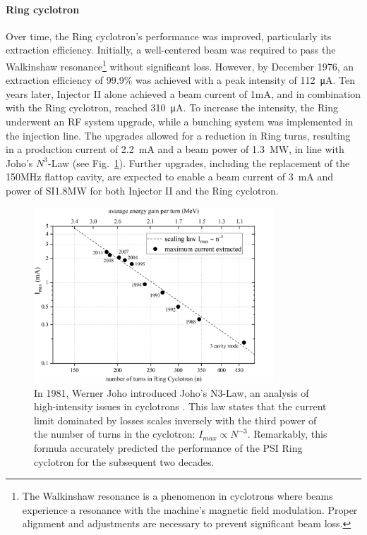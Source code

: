 \begin{refsection}
        \paragraph{Ring cyclotron}
        Over time, the Ring cyclotron's performance was improved, particularly its extraction efficiency. 
        Initially, a well-centered beam was required to pass the Walkinshaw resonance\footnote{The Walkinshaw resonance is a phenomenon in cyclotrons where beams experience a resonance with the machine's magnetic field modulation. Proper alignment and adjustments are necessary to prevent significant beam loss.} without significant loss.
        However, by December 1976, an extraction efficiency of 99.9\% was achieved with a peak intensity of \SI{112}{\micro A}. 
        Ten years later, Injector II alone achieved a beam current of 1mA, and in combination with the Ring cyclotron, reached \SI{310}{\micro A}.
        To increase the intensity, the Ring underwent an RF system upgrade, while a bunching system was implemented in the injection line. 
        The upgrades allowed for a reduction in Ring turns, resulting in a production current of \SI{2.2}{mA} and a beam power of \SI{1.3}{MW}, in line with Joho's $N^3$-Law (see Fig.~\ref{fig:PSI:HIPA:joho}). 
        Further upgrades, including the replacement of the 150MHz flattop cavity, are expected to enable a beam current of \SI{3}{mA} and power of SI{1.8}{MW} for both Injector II and the Ring cyclotron.
        \begin{figure}
            \centering
            \includegraphics[width = 0.8\textwidth]{Figures/Introduction/PSI_HIPA_joho.png}
            \caption{In 1981, Werner Joho introduced Joho's N3-Law, an analysis of high-intensity issues in cyclotrons \cite{joho}. This law states that the current limit dominated by losses scales inversely with the third power of the number of turns in the cyclotron: $I_{max}\propto N^{-3}$. Remarkably, this formula accurately predicted the performance of the PSI Ring cyclotron for the subsequent two decades.}
            \label{fig:PSI:HIPA:joho}
        \end{figure}
        

\end{refsection}

